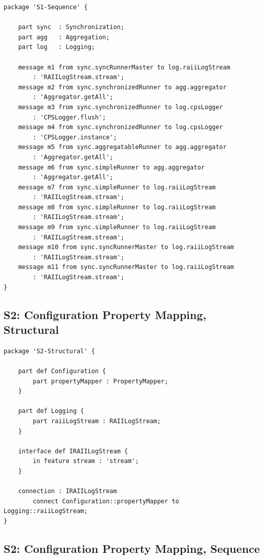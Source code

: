 \begin{verbatim}
package 'S1-Sequence' {

    part sync  : Synchronization;
    part agg   : Aggregation;
    part log   : Logging;

    message m1 from sync.syncRunnerMaster to log.raiiLogStream
        : 'RAIILogStream.stream';
    message m2 from sync.synchronizedRunner to agg.aggregator
        : 'Aggregator.getAll';
    message m3 from sync.synchronizedRunner to log.cpsLogger
        : 'CPSLogger.flush';
    message m4 from sync.synchronizedRunner to log.cpsLogger
        : 'CPSLogger.instance';
    message m5 from sync.aggregatableRunner to agg.aggregator
        : 'Aggregator.getAll';
    message m6 from sync.simpleRunner to agg.aggregator
        : 'Aggregator.getAll';
    message m7 from sync.simpleRunner to log.raiiLogStream
        : 'RAIILogStream.stream';
    message m8 from sync.simpleRunner to log.raiiLogStream
        : 'RAIILogStream.stream';
    message m9 from sync.simpleRunner to log.raiiLogStream
        : 'RAIILogStream.stream';
    message m10 from sync.syncRunnerMaster to log.raiiLogStream
        : 'RAIILogStream.stream';
    message m11 from sync.syncRunnerMaster to log.raiiLogStream
        : 'RAIILogStream.stream';
}
\end{verbatim}

\subsection{S2: Configuration Property Mapping, Structural}

\begin{verbatim}
package 'S2-Structural' {

    part def Configuration {
        part propertyMapper : PropertyMapper;
    }

    part def Logging {
        part raiiLogStream : RAIILogStream;
    }

    interface def IRAIILogStream {
        in feature stream : 'stream';
    }

    connection : IRAIILogStream
        connect Configuration::propertyMapper to Logging::raiiLogStream;
}
\end{verbatim}

\subsection{S2: Configuration Property Mapping, Sequence}

